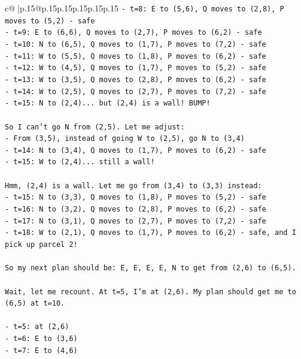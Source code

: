 \documentclass{article}
\begin{document}
{\begin{supertabular}{c@{$\;$}|p{.15\linewidth}@{}p{.15\linewidth}p{.15\linewidth}p{.15\linewidth}p{.15\linewidth}p{.15\linewidth}}
{{{\texttt{{-} t=8: E to (5,6), Q moves to (2,8), P moves to (5,2) {-} safe} \\
\texttt{{-} t=9: E to (6,6), Q moves to (2,7), P moves to (6,2) {-} safe} \\
\texttt{{-} t=10: N to (6,5), Q moves to (1,7), P moves to (7,2) {-} safe} \\
\texttt{{-} t=11: W to (5,5), Q moves to (1,8), P moves to (6,2) {-} safe} \\
\texttt{{-} t=12: W to (4,5), Q moves to (1,7), P moves to (5,2) {-} safe} \\
\texttt{{-} t=13: W to (3,5), Q moves to (2,8), P moves to (6,2) {-} safe} \\
\texttt{{-} t=14: W to (2,5), Q moves to (2,7), P moves to (7,2) {-} safe} \\
\texttt{{-} t=15: N to (2,4)... but (2,4) is a wall! BUMP!} \\
\\ 
\texttt{So I can't go N from (2,5). Let me adjust:} \\
\texttt{{-} From (3,5), instead of going W to (2,5), go N to (3,4)} \\
\texttt{{-} t=14: N to (3,4), Q moves to (1,7), P moves to (6,2) {-} safe} \\
\texttt{{-} t=15: W to (2,4)... still a wall!} \\
\\ 
\texttt{Hmm, (2,4) is a wall. Let me go from (3,4) to (3,3) instead:} \\
\texttt{{-} t=15: N to (3,3), Q moves to (1,8), P moves to (5,2) {-} safe} \\
\texttt{{-} t=16: N to (3,2), Q moves to (2,8), P moves to (6,2) {-} safe} \\
\texttt{{-} t=17: N to (3,1), Q moves to (2,7), P moves to (7,2) {-} safe} \\
\texttt{{-} t=18: W to (2,1), Q moves to (1,7), P moves to (6,2) {-} safe, and I pick up parcel 2!} \\
\\ 
\texttt{So my next plan should be: E, E, E, E, N to get from (2,6) to (6,5).} \\
\\ 
\texttt{Wait, let me recount. At t=5, I'm at (2,6). My plan should get me to (6,5) at t=10.} \\
\\ 
\texttt{{-} t=5: at (2,6)} \\
\texttt{{-} t=6: E to (3,6)} \\
\texttt{{-} t=7: E to (4,6)} \\
}}}
\end{supertabular}}
\end{document}

